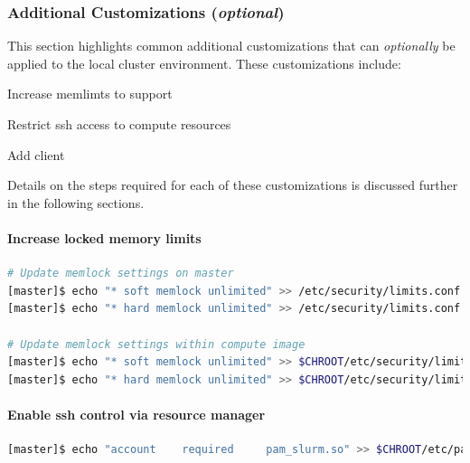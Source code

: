 \documentclass[letterpaper]{article}
\begin{document}
\subsubsection{Additional Customizations ({\em optional})}

This section highlights common additional customizations that
can {\em optionally} be applied to the
local cluster environment. These customizations include:

\begin{itemize*}
\item Increase memlimts to support \InfiniBand{}
\item Restrict ssh access to compute resources
\item Add \Lustre{} client
\end{itemize*}

\noindent Details on the steps required for each of these customizations is
discussed further in the following sections.

\paragraph{Increase locked memory limits}

 

\begin{lstlisting}[language=bash,keywords={},upquote=true]
# Update memlock settings on master
[master]$ echo "* soft memlock unlimited" >> /etc/security/limits.conf
[master]$ echo "* hard memlock unlimited" >> /etc/security/limits.conf

# Update memlock settings within compute image
[master]$ echo "* soft memlock unlimited" >> $CHROOT/etc/security/limits.conf
[master]$ echo "* hard memlock unlimited" >> $CHROOT/etc/security/limits.conf
\end{lstlisting}


\paragraph{Enable ssh control via resource manager} 



\begin{lstlisting}[language=bash,keywords={},upquote=true]
[master]$ echo "account    required     pam_slurm.so" >> $CHROOT/etc/pam.d/sshd
\end{lstlisting}
\end{document}
